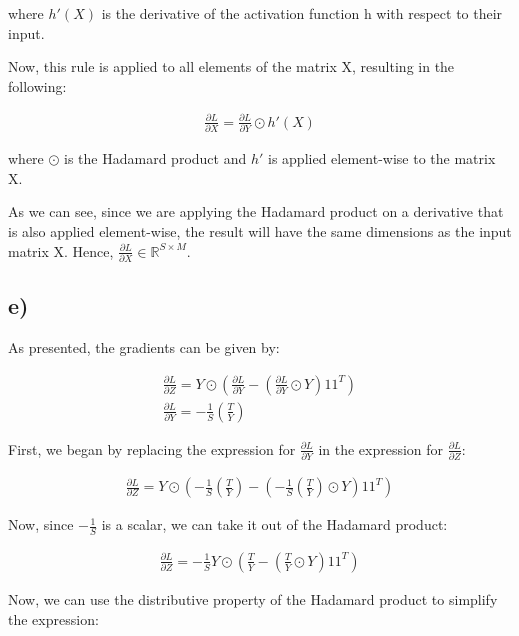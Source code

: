\documentclass{article}
\begin{document}
where $h'(X)$ is the derivative of the activation function h with respect to their input. 

Now, this rule is applied to all elements of the matrix X, resulting in the following:

\begin{align*}
    \frac{\partial L}{\partial X} = \frac{\partial L}{\partial Y} \odot h'(X)
\end{align*}

where $\odot$ is the Hadamard product and $h'$ is applied element-wise to the matrix X.

As we can see, since we are applying the Hadamard product on a derivative that is also applied element-wise,
the result will have the same dimensions as the input matrix X. Hence, $\frac{\partial L}{\partial X} \in \mathbb{R}^{S \times M}$.

\subsection*{e)}

As presented, the gradients can be given by: 

\begin{align*}
    \frac{\partial L}{\partial Z} = Y \odot \left( \frac{\partial L}{\partial Y} - \left( \frac{\partial L}{\partial Y} \odot Y \right) 1 1^T \right) \\
    \frac{\partial L}{\partial Y} = - \frac{1}{S} \left( \frac{T}{Y} \right)
\end{align*}

First, we began by replacing the expression for $\frac{\partial L}{\partial Y}$ in the expression for $\frac{\partial L}{\partial Z}$:

\begin{align*}
    \frac{\partial L}{\partial Z} = Y \odot \left( - \frac{1}{S} \left( \frac{T}{Y} \right) - \left( - \frac{1}{S} \left( \frac{T}{Y} \right) \odot Y \right) 1 1^T \right)
\end{align*}

Now, since $- \frac{1}{S}$ is a scalar, we can take it out of the Hadamard product:

\begin{align*}
    \frac{\partial L}{\partial Z} = - \frac{1}{S} Y \odot \left( \frac{T}{Y} - \left( \frac{T}{Y} \odot Y \right) 1 1^T \right)
\end{align*}

Now, we can use the distributive property of the Hadamard product to simplify the expression:
\end{document}
